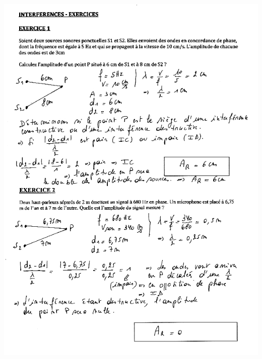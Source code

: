 \includegraphics[width=18.253cm,height=25.273cm]{Pictures/100000010000027000000360A2E9B52B5C1C825B.png}


